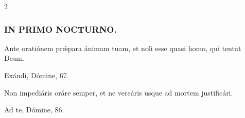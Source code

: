 \documentclass[9pt,twoside]{extarticle}
\begin{document}
\begin{multicols}{2}
\subsubsection*{\center \textsc{IN PRIMO NOCTURNO.}}
\begin{tightlist}{}
\item {} Ante oratiónem prǽpara ánimam tuam, et noli esse quasi homo, qui tentat Deum.
\item {} Exáudi, Dómine, 67.
\end{tightlist}
%
%
%
%
%
%
%
%
%
%
%
%
%
%
%
%
%
%
\begin{tightlist}{}
\item {} Non impediáris oráre semper, et ne vereáris usque ad mortem justificári.
\item {} Ad te, Dómine, 86.
\end{tightlist}


\end{multicols}
\end{document}
